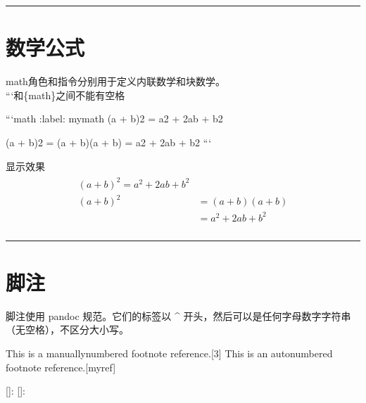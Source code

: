 \documentclass[letterpaper,10pt,english]{sphinxmanual}
\begin{document}
\bigskip\hrule\bigskip



\section{数学公式}
\label{\detokenize{other/myst_markdown:id14}}
\sphinxAtStartPar
math角色和指令分别用于定义内联数学和块数学。\\
 ```和\{math\}之间不能有空格

\begin{sphinxVerbatim}[commandchars=\\\{\}]
    ```\PYGZob{}math\PYGZcb{}
    :label: mymath
    (a + b)\PYGZca{}2 = a\PYGZca{}2 + 2ab + b\PYGZca{}2

    (a + b)\PYGZca{}2  \PYGZam{}=  (a + b)(a + b) \PYGZbs{}\PYGZbs{}
            \PYGZam{}=  a\PYGZca{}2 + 2ab + b\PYGZca{}2
    ```
\end{sphinxVerbatim}

\sphinxAtStartPar
显示效果
\begin{align}\label{equation:other/myst_markdown:mymath}\!\begin{aligned}
(a + b)^2 = a^2 + 2ab + b^2\\
(a + b)^2  &=  (a + b)(a + b) \\
           &=  a^2 + 2ab + b^2\\
\end{aligned}\end{align}

\bigskip\hrule\bigskip



\section{脚注}
\label{\detokenize{other/myst_markdown:id15}}
\sphinxAtStartPar
脚注使用 pandoc 规范。它们的标签以 \textasciicircum{} 开头，然后可以是任何字母数字字符串（无空格），不区分大小写。

\begin{sphinxVerbatim}[commandchars=\\\{\}]
This is a manually\PYGZhy{}numbered footnote reference.[\PYGZca{}3]
This is an auto\PYGZhy{}numbered footnote reference.[\PYGZca{}myref]

[]: 
[]: 
\end{sphinxVerbatim}
\end{document}

